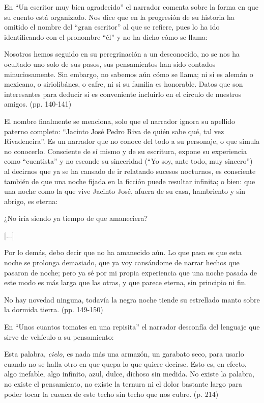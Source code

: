 \documentclass[14pt,twoside,final]{extbook} %
\begin{document}
En ``Un escritor muy bien agradecido'' el narrador comenta sobre la forma en que su cuento está organizado. Nos dice que en la progresión de su historia ha omitido el nombre del ``gran escritor'' al que se refiere, pues lo ha ido identificando con el pronombre ``él'' y no ha dicho cómo se llama:
\begin{quoting}
Nosotros hemos seguido en su peregrinación a un desconocido, no se nos ha ocultado uno solo de sus pasos, sus pensamientos han sido contados minuciosamente. Sin embargo, no sabemos aún cómo se llama; ni si es alemán o mexicano, o siriolibánes, o cafre, ni si su familia es honorable. Datos que son interesantes para deducir si es conveniente incluirlo en el círculo de nuestros amigos. (pp. 140-141)
\end{quoting}
El nombre finalmente se menciona, solo que el narrador ignora su apellido paterno completo: ``Jacinto José Pedro Riva de quién sabe qué, tal vez Rivadeneira''. Es un narrador que no conoce del todo a su personaje, o que simula no conocerlo. Consciente de sí mismo y de su escritura, expone su experiencia como ``cuentista'' y no esconde su sinceridad (``Yo soy, ante todo, muy sincero'') al decirnos que ya se ha cansado de ir relatando sucesos nocturnos, es consciente también de que una noche fijada en la ficción puede resultar infinita; o bien: que una noche como la que vive Jacinto José, afuera de su casa, hambriento y sin abrigo, es eterna:
\begin{quoting}
¿No iría siendo ya tiempo de que amaneciera?

\centerline{[...]}

Por lo demás, debo decir que no ha amanecido aún. Lo que pasa es que esta noche se prolonga demasiado, que ya voy cansándome de narrar hechos que pasaron de noche; pero ya sé por mi propia experiencia que una noche pasada de este modo es más larga que las otras, y que parece eterna, sin principio ni fin.

No hay novedad ninguna, todavía la negra noche tiende su estrellado manto sobre la dormida tierra. (pp. 149-150)
\end{quoting}
En ``Unos cuantos tomates en una repisita'' el narrador desconfía del lenguaje que sirve de vehículo a su pensamiento:
\begin{quoting}
Esta palabra, \emph{cielo,} es nada más una armazón, un garabato seco, para usarlo cuando no se halla otro en que quepa lo que quiere decirse. Esto es, en efecto, algo inefable, algo infinito, azul, dulce, dichoso sin medida. No existe la palabra, no existe el pensamiento, no existe la ternura ni el dolor bastante largo para poder tocar la cuenca de este techo sin techo que nos cubre. (p. 214)
\end{quoting}
\end{document}
